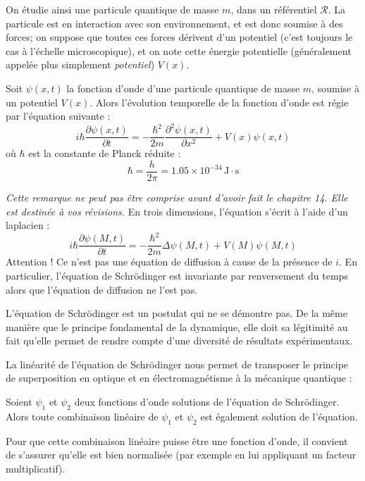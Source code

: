 \documentclass[11pt,fleqn]{book} %
\begin{document}
On étudie ainsi une particule quantique de masse $m$, dans un référentiel $\mathcal{R}$. La particule est en interaction avec son environnement, et est donc soumise à des forces; on suppose que toutes ces forces dérivent d'un potentiel (c'est toujours le cas à l'échelle microscopique), et on note cette énergie potentielle (généralement appelée plus simplement \textit{potentiel}) $V(x)$.

\begin{theorem}
	Soit $\psi(x,t)$ la fonction d'onde d'une particule quantique de masse $m$, soumise à un potentiel $V(x)$. Alors l'évolution temporelle de la fonction d'onde est régie par l'équation suivante :
	\begin{equation}
		i \hbar \frac{\partial \psi(x,t)}{\partial t} = - \frac{\hbar^2}{2 m} \frac{\partial^2 \psi(x,t)}{\partial x^2} + V(x) \psi(x,t)
	\end{equation}
	où $\hbar$ est la constante de Planck réduite :
	\begin{equation}
		\hbar = \frac{h}{2\pi} = 1.05 \times 10^{-34}\,\mathrm{J}\cdot\mathrm{s}
	\end{equation}
\end{theorem}

\begin{remark}
	\textit{Cette remarque ne peut pas être comprise avant d'avoir fait le chapitre 14. Elle est destinée à vos révisions.} En trois dimensions, l'équation s'écrit à l'aide d'un laplacien :
	\begin{equation}
		i \hbar \frac{\partial \psi(M,t)}{\partial t} = - \frac{\hbar^2}{2 m} \Delta \psi(M,t) + V(M) \psi(M,t)
        \end{equation}
	Attention ! Ce n'est pas une équation de diffusion à cause de la présence de $i$. En particulier, l'équation de Schrödinger est invariante par renversement du temps alors que l'équation de diffusion ne l'est pas.
\end{remark}

L'équation de Schrödinger est un postulat qui ne se démontre pas. De la même manière que le principe fondamental de la dynamique, elle doit sa légitimité au fait qu'elle permet de rendre compte d'une diversité de résultats expérimentaux.

La linéarité de l'équation de Schrödinger nous permet de transposer le principe de superposition en optique et en électromagnétisme à la mécanique quantique :
\begin{proposition}
	Soient $\psi_1$ et $\psi_2$ deux fonctions d'onde solutions de l'équation de Schrödinger. Alors toute combinaison linéaire de $\psi_1$ et $\psi_2$ est également solution de l'équation. 
\end{proposition}
\begin{remark}
	Pour que cette combinaison linéaire puisse être une fonction d'onde, il convient de s'assurer qu'elle est bien normalisée (par exemple en lui appliquant un facteur multiplicatif). 
\end{remark}
\end{document}

